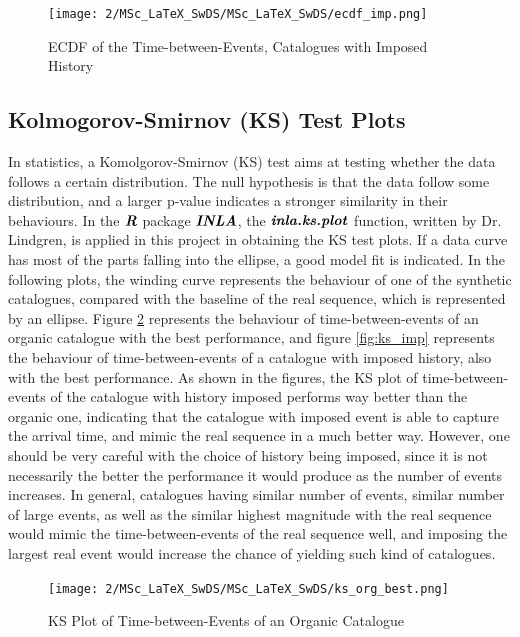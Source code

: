 \documentclass[11pt,twoside]{article}
\numberwithin{Theorem}{section}
\numberwithin{Definition}{section}
\numberwithin{Lemma}{section}
\numberwithin{Algorithm}{section}
\numberwithin{equation}{section}
\begin{document}
\begin{figure}[H]
\centering
\texttt{[image: 2/MSc\_LaTeX\_SwDS/MSc\_LaTeX\_SwDS/ecdf\_imp.png]}
\caption{ECDF of the Time-between-Events, Catalogues with Imposed History}
\label{fig:ecdf_imp}
\end{figure}

\subsection{Kolmogorov-Smirnov (KS) Test Plots}
In statistics, a Komolgorov-Smirnov (KS) test aims at testing whether the data follows a certain distribution. The null hypothesis is that the data follow some distribution, and a larger p-value indicates a stronger similarity in their behaviours. In the $\textbf{\textit{R}}$ package $\textbf{\textit{INLA}}$, the $\textbf{\textit{inla.ks.plot}}$ function, written by Dr. Lindgren, is applied in this project in obtaining the KS test plots. If a data curve has most of the parts falling into the ellipse, a good model fit is indicated. In the following plots, the winding curve represents the behaviour of one of the synthetic catalogues, compared with the baseline of the real sequence, which is represented by an ellipse. Figure \ref{fig:ks_org} represents the behaviour of time-between-events of an organic catalogue with the best performance, and figure \ref{fig:ks_imp} represents the behaviour of time-between-events of a catalogue with imposed history, also with the best performance. As shown in the figures, the KS plot of time-between-events of the catalogue with history imposed performs way better than the organic one, indicating that the catalogue with imposed event is able to capture the arrival time, and mimic the real sequence in a much better way. However, one should be very careful with the choice of history being imposed, since it is not necessarily the better the performance it would produce as the number of events increases. In general, catalogues having similar number of events, similar number of large events, as well as the similar highest magnitude with the real sequence would mimic the time-between-events of the real sequence well, and imposing the largest real event would increase the chance of yielding such kind of catalogues.

\begin{figure}[h]
\centering

\texttt{[image: 2/MSc\_LaTeX\_SwDS/MSc\_LaTeX\_SwDS/ks\_org\_best.png]}
\caption{KS Plot of Time-between-Events of an Organic Catalogue}
\label{fig:ks_org}
\end{figure}
\end{document}
